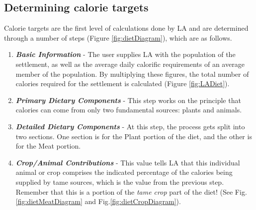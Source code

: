 \subsection{Determining calorie targets}
  Calorie targets are the first level of calculations done by LA and are
  determined through a number of steps (Figure \ref{fig:dietDiagram}), which
  are as follows.
    \begin{enumerate}
      \item \textbf{\textit{Basic Information}} - The user supplies LA with the
        population of the settlement, as well as the average daily calorific
        requirements of an average member of the population.  By multiplying
        these figures, the total number of calories required for the
        settlement is calculated (Figure \ref{fig:LADiet}).
      \item \textbf{\textit{Primary Dietary Components}} - This step works on
        the principle that calories can come from only two fundamental sources:
        plants and animals.
      \item \textbf{\textit{Detailed Dietary Components}} - At this step, the
        process gets split into two sections.  One section is for the Plant
        portion of the diet, and the other is for the Meat portion.
      \item \textbf{\textit{Crop/Animal Contributions}} - This value tells LA
        that this individual animal or crop comprises the indicated percentage of
        the calories being supplied by tame sources, which is the value from the
        previous step. Remember that this is a portion of the \textit{tame crop}
        part of the diet! 
        (See Fig. \ref{fig:dietMeatDiagram} and Fig.\ref{fig:dietCropDiagram}).
    \end{enumerate}

